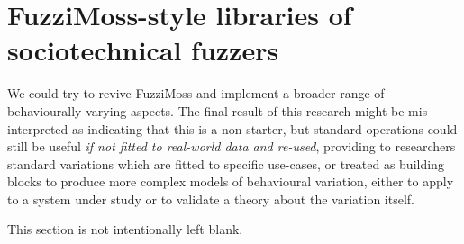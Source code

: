 \section{FuzziMoss-style libraries of sociotechnical
fuzzers}\label{sec:future_work_revive_fuzzimoss}

We could try to revive FuzziMoss and implement a broader range of behaviourally
varying aspects. The final result of this research might be mis-interpreted as
indicating that this is a non-starter, but standard operations could still be
useful \emph{if not fitted to real-world data and re-used}, providing to
researchers standard variations which are fitted to specific use-cases, or
treated as building blocks to produce more complex models of behavioural
variation, either to apply to a system under study or to validate a theory about
the variation itself.


This section is not intentionally left blank.

